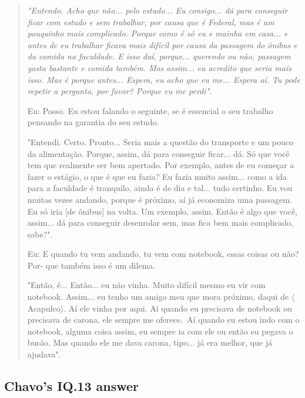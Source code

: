 \begin{quote}
    \itshape
    "Entendo. Acho que não... pelo estudo... Eu consigo... dá para conseguir ficar com estudo e sem trabalhar, por causa que é Federal, mas é um pouquinho mais complicado. Porque como é só eu e mainha em casa... e antes de eu trabalhar ficava mais difícil por causa da passagem do ônibus e da comida na faculdade. E isso daí, porque... querendo ou não, passagem gasta bastante e comida também. Mas assim... eu acredito que seria mais isso. Mas é porque antes... Espera, eu acho que eu me... Espera aí. Tu pode repetir a pergunta, por favor? Porque eu me perdi". 

    \colorbox{black!15}{Eu: Posso. Eu estou falando o seguinte, se é essencial o seu trabalho pensando na} 
    \colorbox{black!15}{garantia do seu estudo.}

    "Entendi. Certo. Pronto... Seria mais a questão do transporte e um pouco da alimentação. Porque, assim, dá para conseguir ficar... dá. Só que você tem que realmente ser bem apertado. Por exemplo, antes de eu começar a fazer o estágio, o que é que eu fazia? Eu fazia muito assim... como a ida para a faculdade é tranquilo, ainda é de dia e tal... tudo certinho. Eu vou muitas vezes andando, porque é próximo, aí já economiza uma passagem. Eu só iria [de ônibus] na volta. Um exemplo, assim. Então é algo que você, assim... dá para conseguir desenrolar sem, mas fica bem mais complicado, sabe?".

    \colorbox{black!15}{Eu: E quando tu vem andando, tu vem com notebook, essas coisas ou não? Por-} \colorbox{black!15}{que também isso é um dilema.} 

    "Então, é... Então... eu não vinha. Muito difícil mesmo eu vir com notebook. Assim... eu tenho um amigo meu que mora próximo, daqui de $\langle$Acapulco$\rangle$. Aí ele vinha por aqui. Aí quando eu precisava de notebook ou precisava de carona, ele sempre me oferece. Aí quando eu estou indo com o notebook, alguma coisa assim, eu sempre ia com ele ou então eu pegava o busão. Mas quando ele me dava carona, tipo... já era melhor, que já ajudava". 
\end{quote}
\subsection{Chavo’s IQ.13 answer}
\label{interview-exc-ss:chavo-iq13}

